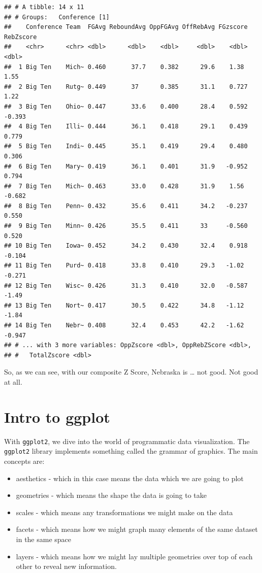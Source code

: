 \documentclass[]{book}
\providecommand{\tightlist}{%
  \setlength{\itemsep}{0pt}\setlength{\parskip}{0pt}}
\begin{document}
\begin{verbatim}
## # A tibble: 14 x 11
## # Groups:   Conference [1]
##    Conference Team  FGAvg ReboundAvg OppFGAvg OffRebAvg FGzscore RebZscore
##    <chr>      <chr> <dbl>      <dbl>    <dbl>     <dbl>    <dbl>     <dbl>
##  1 Big Ten    Mich~ 0.460       37.7    0.382      29.6    1.38      1.55 
##  2 Big Ten    Rutg~ 0.449       37      0.385      31.1    0.727     1.22 
##  3 Big Ten    Ohio~ 0.447       33.6    0.400      28.4    0.592    -0.393
##  4 Big Ten    Illi~ 0.444       36.1    0.418      29.1    0.439     0.779
##  5 Big Ten    Indi~ 0.445       35.1    0.419      29.4    0.480     0.306
##  6 Big Ten    Mary~ 0.419       36.1    0.401      31.9   -0.952     0.794
##  7 Big Ten    Mich~ 0.463       33.0    0.428      31.9    1.56     -0.682
##  8 Big Ten    Penn~ 0.432       35.6    0.411      34.2   -0.237     0.550
##  9 Big Ten    Minn~ 0.426       35.5    0.411      33     -0.560     0.520
## 10 Big Ten    Iowa~ 0.452       34.2    0.430      32.4    0.918    -0.104
## 11 Big Ten    Purd~ 0.418       33.8    0.410      29.3   -1.02     -0.271
## 12 Big Ten    Wisc~ 0.426       31.3    0.410      32.0   -0.587    -1.49 
## 13 Big Ten    Nort~ 0.417       30.5    0.422      34.8   -1.12     -1.84 
## 14 Big Ten    Nebr~ 0.408       32.4    0.453      42.2   -1.62     -0.947
## # ... with 3 more variables: OppZscore <dbl>, OppRebZScore <dbl>,
## #   TotalZscore <dbl>
\end{verbatim}

So, as we can see, with our composite Z Score, Nebraska is \ldots{} not good. Not good at all.

\hypertarget{intro-to-ggplot}{%
\chapter{Intro to ggplot}\label{intro-to-ggplot}}

With \texttt{ggplot2}, we dive into the world of programmatic data visualization. The \texttt{ggplot2} library implements something called the grammar of graphics. The main concepts are:

\begin{itemize}
\tightlist
\item
  aesthetics - which in this case means the data which we are going to plot
\item
  geometries - which means the shape the data is going to take
\item
  scales - which means any transformations we might make on the data
\item
  facets - which means how we might graph many elements of the same dataset in the same space
\item
  layers - which means how we might lay multiple geometries over top of each other to reveal new information.
\end{itemize}
\end{document}
